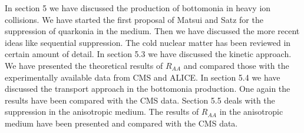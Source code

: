 In section 5 we have discussed the production of bottomonia in heavy ion collisions. We have started the first proposal of 
Matsui and Satz for the suppression of quarkonia in the medium. Then we have discussed the more recent ideas like 
sequential suppression. The cold nuclear matter has been reviewed in certain amount of detail. In section 5.3 
we have discussed the kinetic approach. We have presented the theoretical results of $R_{AA}$ and compared those with the 
experimentally available data from CMS and ALICE. In section 5.4 we have discussed the transport approach in the 
bottomonia production. One again the results have been compared with the CMS data. Section 5.5 deals with the 
suppression in the anisotropic medium. The results of $R_{AA}$ in the anisotropic medium have been presented 
and compared with the CMS data. 

